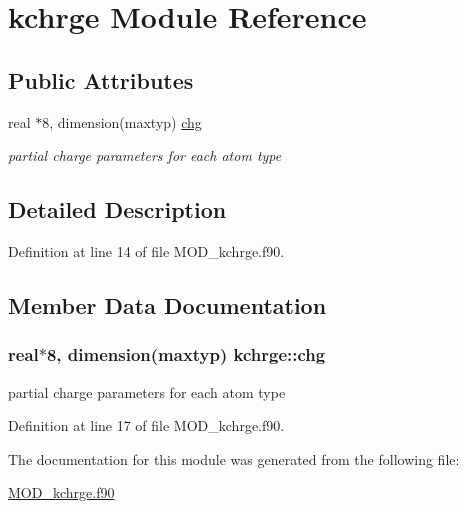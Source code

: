 \hypertarget{classkchrge}{\section{kchrge Module Reference}
\label{classkchrge}
}
\subsection*{Public Attributes}
\begin{DoxyCompactItemize}
\item 
real $\ast$8, dimension(maxtyp) \hyperlink{classkchrge_aa9c5e29ed4a28361cc169944d1c82469}{chg}
\begin{DoxyCompactList}\small\item\em partial charge parameters for each atom type \end{DoxyCompactList}\end{DoxyCompactItemize}


\subsection{Detailed Description}


Definition at line 14 of file M\-O\-D\-\_\-kchrge.\-f90.



\subsection{Member Data Documentation}
\hypertarget{classkchrge_aa9c5e29ed4a28361cc169944d1c82469}{
\subsubsection[{chg}]{\setlength{\rightskip}{0pt plus 5cm}real$\ast$8, dimension(maxtyp) kchrge\-::chg}}\label{classkchrge_aa9c5e29ed4a28361cc169944d1c82469}


partial charge parameters for each atom type 



Definition at line 17 of file M\-O\-D\-\_\-kchrge.\-f90.



The documentation for this module was generated from the following file\-:\begin{DoxyCompactItemize}
\item 
\hyperlink{MOD__kchrge_8f90}{M\-O\-D\-\_\-kchrge.\-f90}\end{DoxyCompactItemize}
